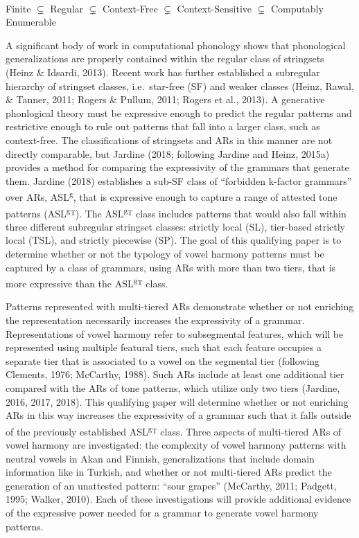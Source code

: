 \documentclass[,doc,floatsintext]{apa6}
\theoremstyle{definition}
\theoremstyle{definition}
\theoremstyle{definition}
\theoremstyle{remark}
\begin{document}
\begin{exe}
\label{chomsky.hierarchy} \\ 
Finite $\subsetneq$ Regular $\subsetneq$ Context-Free $\subsetneq$ Context-Sensitive $\subsetneq$ Computably Enumerable
\end{exe}

A significant body of work in computational phonology shows that
phonological generalizations are properly contained within the regular
class of stringsets (Heinz \& Idsardi, 2013). Recent work has further
established a subregular hierarchy of stringset classes, i.e.~star-free
(SF) and weaker classes (Heinz, Rawal, \& Tanner, 2011; Rogers \&
Pullum, 2011; Rogers et al., 2013). A generative phonlogical theory must
be expressive enough to predict the regular patterns and restrictive
enough to rule out patterns that fall into a larger class, such as
context-free. The classifications of stringsets and ARs in this manner
are not directly comparable, but Jardine (2018; following Jardine and
Heinz, 2015a) provides a method for comparing the expressivity of the
grammars that generate them. Jardine (2018) establishes a sub-SF class
of \enquote{forbidden k-factor grammars} over ARs,
ASL\textsuperscript{g}, that is expressive enough to capture a range of
attested tone patterns (ASL\textsuperscript{g\textsubscript{T}}). The
ASL\textsuperscript{g\textsubscript{T}} class includes patterns that
would also fall within three different subregular stringset classes:
strictly local (SL), tier-based strictly local (TSL), and strictly
piecewise (SP). The goal of this qualifying paper is to determine
whether or not the typology of vowel harmony patterns must be captured
by a class of grammars, using ARs with more than two tiers, that is more
expressive than the ASL\textsuperscript{g\textsubscript{T}} class.

Patterns represented with multi-tiered ARs demonstrate whether or not
enriching the representation necessarily increases the expressivity of a
grammar. Representations of vowel harmony refer to subsegmental
features, which will be represented using multiple featural tiers, such
that each feature occupies a separate tier that is associated to a vowel
on the segmental tier (following Clements, 1976; McCarthy, 1988). Such
ARs include at least one additional tier compared with the ARs of tone
patterns, which utilize only two tiers (Jardine, 2016, 2017, 2018). This
qualifying paper will determine whether or not enriching ARs in this way
increases the expressivity of a grammar such that it falls outside of
the previously established ASL\textsuperscript{g\textsubscript{T}}
class. Three aspects of multi-tiered ARs of vowel harmony are
investigated: the complexity of vowel harmony patterns with neutral
vowels in Akan and Finnish, generalizations that include domain
information like in Turkish, and whether or not multi-tiered ARs predict
the generation of an unattested pattern: \enquote{sour grapes}
(McCarthy, 2011; Padgett, 1995; Walker, 2010). Each of these
investigations will provide additional evidence of the expressive power
needed for a grammar to generate vowel harmony patterns.
\end{document}
